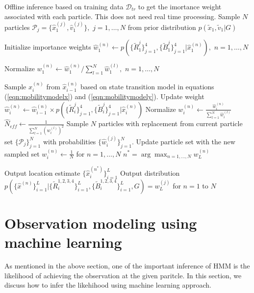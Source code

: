 \documentclass[conference, 10pt]{IEEEtran}
\begin{document}
\begin{algorithm}
\caption{$5GLocalizeAlgo(\mathcal{D}_{tr},G,N_{th})$}
\label{alg:LocalizeUEpf}
\begin{algorithmic}[1]
\State Offline inference based on training data $\mathcal{D}_{tr}$ to get the imortance weight associated with each particle. This does not need real time processing.
\State Sample $N$ particles $\mathcal{P}_j = \{\hat{x}_1^{(j)},\hat{v}_1^{(j)}\},$ $j=1,\hdots , N$ 
from prior distribution $p(\tilde{x}_1, \tilde{v}_1|G)$ 

\State Initialize importance weights $\hat{w}_1^{(n)} \gets p(\{\tilde{R}^j_1\}_{j=1}^4,\{\tilde{B}^j_1\}_{j=1}^4|\hat{x}_1^{(n)}),$ $n=1,\hdots , N$

\State Normalize $w_1^{(n)} \gets \hat{w}_1^{(n)}/\sum_{l=1}^N \hat{w}_1^{(l)},$ $n=1,\hdots , N$

		\State Sample $\hat{x}_i^{(n)}$ from $\hat{x}_{i-1}^{(n)}$ based on state transition model in equations (\ref{eqn:mobilitymodelx}) and (\ref{eqn:mobilitymodely}).
		\State Update weight $\hat{w}_i^{(n)} \gets \hat{w}_{i-1}^{(n)} \times p(\{\tilde{R}^j_i\}_{j=1}^4, \{\tilde{B}^j_i\}_{j=1}^4|\hat{x}_{i}^{(n)})$ 
	\EndFor
	\State Normalize $w_i^{(n)} \gets \frac{\hat{w}_i^{(n)}}{\sum_{l=1}^N \hat{w}_i^{(l)}}$
	\State $\hat{N}_{eff} \gets \frac{1}{\sum_{l=1}^N (w_{i}^{(l)})^2}$
		\State Sample $N$ particles with replacement from current particle set $\{\mathcal{P}_j\}_{j=1}^N$ with probabilities $\{\hat{w}_i^{(j)}\}_{j=1}^N.$ Update particle set with the new sampled set
		\State $w_i^{(n)} \gets \frac{1}{N}$ for $n=1,\hdots , N$
	\EndIf
\EndFor
\State $n^* = \arg \max_{n = 1 , \hdots, N} w_L^{(n)}$

\State Output location estimate $\{\hat{x}_i^{(n^*)}\}_{i=1}^L$ 
\State Output distribution \\
$p(\{\hat{x}^{(n)}\}_{i=1}^L|\{\tilde{R}^{1,2,3,4}_i\}_{i=1}^L,\{\tilde{B}^{1,2,3,4}_i\}_{i=1}^L,G) = w_L^{(j)}$ for $n=1$ to $N$
\end{algorithmic}
\end{algorithm}  


\section{Observation modeling using machine learning}
\label{sec:channel-model}
As mentioned in the above section, one of the important inference of HMM is the likelihood of achieving the observation at the given paritcle. In this section, we discuss how to infer the likehihood using machine learning approach. 
\end{document}
